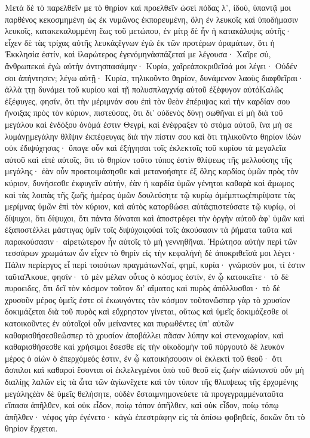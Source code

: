 Μετὰ δὲ τὸ παρελθεῖν με τὸ θηρίον καὶ προελθεῖν ὡσεὶ πόδας λ’, ἰδού, ὑπαντᾷ μοι παρθένος κεκοσμημένη ὡς ἐκ νυμῶνος ἐκπορευμένη, ὅλη ἐν λευκοῖς καὶ ὑποδήμασιν λευκοῖς, κατακεκαλυμμένη ἕως τοῦ μετώπου, ἐν μίτρͅ δὲ ἦν ἡ κατακάλυψις αὐτῆς· εἶχεν δὲ τὰς τρίχας αὐτῆς λευκάςἔγνων ἐγὼ ἐκ τῶν προτέρων ὁραμάτων, ὅτι ἡ Ἐκκλησία ἐστίν, καὶ ἱλαρώτερος ἐγενόμηνἀσπάζεταί με λέγουσα· Χαῖρε σύ, ἄνθρωπεκαὶ ἐγὼ αὐτὴν ἀντησπασάμην· Κυρία, χαῖρεἀποκριθεῖσά μοι λέγει· Οὐδέν σοι ἀπήντησεν; λέγω αὐτῇ· Κυρία, τηλικοῦντο θηρίον, δυνάμενον λαοὺς διαφθεῖραι· ἀλλὰ τͅτῃ δυνάμει τοῦ κυρίου καὶ τῇ πολυσπλαγχνίᾳ αὐτοῦ ἐξέφυγον αὐτόΚαλῶς ἐξέφυγες, φησίν, ὅτι τὴν μέριμνάν σου ἐπὶ τὸν θεὸν ἐπέριψας καὶ τὴν καρδίαν σου ἤνοιξας πρὸς τὸν κύριον, πιστεύσας, ὅτι δι’ οὐδενὸς δύνῃ σωθῆναι εἰ μὴ διὰ τοῦ μεγάλου καὶ ἐνδόξου ὀνόμά ἐστιν Θεγρί, καὶ ἐνέφραξεν τὸ στόμα αὐτοῦ, ἵνα μή σε λυμάνῃμεγάλην θλῖψιν ἐκπέφευγας διὰ τὴν πίστιν σου καὶ ὅτι τηλικοῦντο θηρίον ἰδὼν οὐκ ἐδιψύχησας· ὕπαγε οὖν καὶ ἐξήγησαι τοῖς ἐκλεκτοῖς τοῦ κυρίου τὰ μεγαλεῖα αὐτοῦ καὶ εἰπὲ αὐτοῖς, ὅτι τὸ θηρίον τοῦτο τύπος ἐστὶν θλίψεως τῆς μελλούσης τῆς μεγάλης· ἐὰν οὖν προετοιμάσησθε καὶ μετανοήσητε ἐξ ὅλης καρδίας ὑμῶν πρὸς τὸν κύριον, δυνήσεσθε ἐκφυγεῖν αὐτήν, ἐὰν ἡ καρδία ὑμῶν γένηται καθαρὰ καὶ ἄμωμος καὶ τὰς λοιπὰς τῆς ζωῆς ἡμέρας ὑμῶν δουλεύσητε τῷ κυρίῳ ἀμέμπτωςἐπιρίψατε τὰς μερίμνας ὑμῶν ἐπὶ τὸν κύριον, καὶ αὐτὸς κατορθώσει αὐτάςπιστεύσατε τῷ κυρίῳ, οἱ δίψυχοι, ὅτι δίψυχοι, ὅτι πάντα δύναται καὶ ἀποστρέφει τὴν ὀργὴν αὐτοῦ ἀφ’ ὑμῶν καὶ ἐξαποστέλλει μάστιγας ὑμῖν τοῖς διψύχοιςοὐαὶ τοῖς ἀκούσασιν τὰ ῥήματα ταῦτα καὶ παρακούσασιν· αἱρετώτερον ἦν αὐτοῖς τὸ μὴ γεννηθῆναι.
Ἠρώτησα αὐτὴν περὶ τῶν τεσσάρων χρωμάτων ὧν εἶχεν τὸ θηρίν εἰς τὴν κεφαλήνἡ δὲ ἀποκριθεῖσά μοι λέγει· Πάλιν περίεργος εἶ περὶ τοιούτων πραγμάτωνΝαί, φημί, κυρία· γνώρισόν μοι, τί ἐστιν ταῦταἌκουε, φησίν· τὸ μὲν μέλαν οὗτος ὁ κόσμος ἐστίν, ἐν ᾧ κατοικεῖτε· τὸ δὲ πυροειδες, ὅτι δεῖ τὸν κόσμον τοῦτον δι’ αἵματος καὶ πυρὸς ἀπόλλυσθαι· τὸ δὲ χρυσοῦν μέρος ὑμεῖς ἐστε οἱ ἐκωυγόντες τὸν κόσμον τοῦτονὥσπερ γὰρ τὸ χρυσίον δοκιμάζεται διὰ τοῦ πυρὸς καὶ εὔχρηστον γίνεται, οὕτως καὶ ὑμεῖς δοκιμάζεσθε οἱ κατοικοῦντες ἐν αὐτοῖςοἱ οὖν μείναντες και πυρωθέντες ὑπ’ αὐτῶν καθαρισθήσεσθεὥσπερ τὸ χρυσίον ἀποβάλλει πᾶσαν λύπην καὶ στενοχωρίαν, καὶ καθαρισθήσεσθε καὶ χρήσιμοι ἔσεσθε εἰς τὴν οἰκοδομὴν τοῦ πύργουτὸ δὲ λευκὸν μέρος ὁ αἰὼν ὁ ἐπερχόμεός ἐστιν, ἐν ᾧ κατοικήσουσιν οἱ ἐκλεκτὶ τοῦ θεοῦ· ὅτι ἄσπιλοι καὶ καθαροὶ ἔσονται οἱ ἐκλελεγμένοι ὑπὸ τοῦ θεοῦ εἰς ζωὴν αἰώνιονσὺ οὖν μὴ διαλίῃς λαλῶν εἰς τὰ ὦτα τῶν ἁγίωνἔχετε καὶ τὸν τύπον τῆς θλιπψεως τῆς ἐρχομένης μεγάληςἐὰν δὲ ὑμεῖς θελήσητε, οὐδὲν ἔσταιμνημονεύετε τὰ προγεγραμμέναταῦτα εἴπασα ἀπῆλθεν, καὶ οὐκ εἶδον, ποίῳ τόπον ἀπῆλθεν, καὶ οὐκ εἶδον, ποίῳ τόπῳ ἀπῆλθεν· νέφος γὰρ ἐγένετο· κἀγὼ ἐπεστράφην εἰς τὰ ὀπίσω φοβηθείς, δοκῶν ὅτι τὸ θηρίον ἔρχεται.

